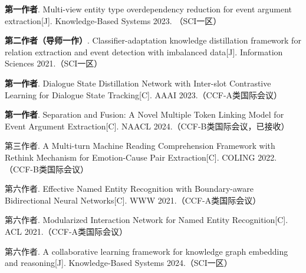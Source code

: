 
\begin{publications}{99}

    \item\textsc{\textbf{第一作者}}. {Multi-view entity type overdependency reduction for event argument extraction}[J]. Knowledge-Based Systems 2023. （SCI一区）

    \item\textsc{\textbf{第二作者（导师一作）}}. {Classifier-adaptation knowledge distillation framework for relation extraction and event detection with imbalanced data}[J]. Information Sciences 2021.（SCI一区）

    \item\textsc{\textbf{第一作者}}. {Dialogue State Distillation Network with Inter-slot Contrastive Learning for Dialogue State Tracking}[C]. AAAI 2023.（CCF-A类国际会议）

    \item\textsc{\textbf{第一作者}}. {Separation and Fusion: A Novel Multiple Token Linking Model for Event Argument Extraction}[C]. NAACL 2024.（CCF-B类国际会议，已接收）

    \item\textsc{第三作者}. {A Multi-turn Machine Reading Comprehension Framework with Rethink Mechanism for Emotion-Cause Pair Extraction}[C]. COLING 2022.（CCF-B类国际会议）

    \item\textsc{第六作者}. {Effective Named Entity Recognition with Boundary-aware Bidirectional Neural Networks}[C]. WWW 2021.（CCF-A类国际会议）

    \item\textsc{第六作者}. {Modularized Interaction Network for Named Entity Recognition}[C]. ACL 2021.（CCF-A类国际会议）

    \item\textsc{第六作者}. {A collaborative learning framework for knowledge graph embedding and reasoning}[J].
    Knowledge-Based Systems 2024.（SCI一区）
    
\end{publications}
